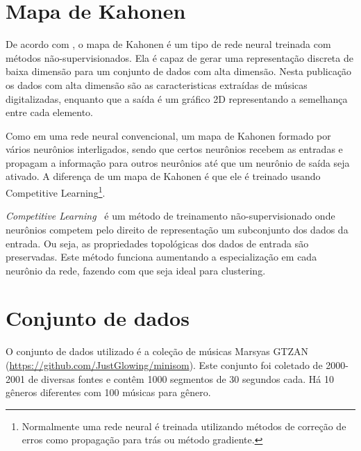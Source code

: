 \documentclass[journal]{IEEEtran}
\begin{document}
\section{Mapa de Kahonen}
De acordo com \cite{kohonen}, o mapa de Kahonen é um tipo de rede neural treinada com métodos não-supervisionados. Ela é capaz de gerar uma representação discreta de baixa dimensão para um conjunto de dados com alta dimensão. Nesta publicação os dados com alta dimensão são as caracteristicas extraídas de músicas digitalizadas, enquanto que a saída é um gráfico 2D representando a semelhança entre cada elemento.

Como em uma rede neural convencional, um mapa de Kahonen formado por vários neurônios interligados, sendo que certos neurônios recebem as entradas e propagam a informação para outros neurônios até que um neurônio de saída seja ativado. A diferença de um mapa de Kahonen é que ele é treinado usando Competitive Learning\footnote{Normalmente uma rede neural é treinada utilizando métodos de correção de erros como propagação para trás ou método gradiente.}.

\textit{Competitive Learning}~\cite{c-learning} é um método de treinamento não-supervisionado onde neurônios competem pelo direito de representação um subconjunto dos dados da entrada. Ou seja, as propriedades topológicas dos dados de entrada são preservadas. Este método funciona aumentando a especialização em cada neurônio da rede, fazendo com que seja ideal para clustering.

\section{Conjunto de dados}
O conjunto de dados utilizado é a coleção de músicas Marsyas GTZAN (\href{https://github.com/JustGlowing/minisom}{https://github.com/JustGlowing/minisom}). Este conjunto foi coletado de 2000-2001 de diversas fontes e contêm 1000 segmentos de 30 segundos cada. Há 10 gêneros diferentes com 100 músicas para gênero.
\end{document}

